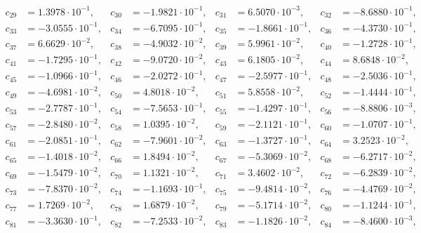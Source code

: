 \begin{align*}
c_{ 29 } &= 1.3978 \cdot 10^{ -1 }, & c_{ 30 } &= -1.9821 \cdot 10^{ -1 }, & c_{ 31 } &= 6.5070 \cdot 10^{ -3 }, & c_{ 32 } &= -8.6880 \cdot 10^{ -1 },\\ 
c_{ 33 } &= -3.0555 \cdot 10^{ -1 }, & c_{ 34 } &= -6.7095 \cdot 10^{ -1 }, & c_{ 35 } &= -1.8661 \cdot 10^{ -1 }, & c_{ 36 } &= -4.3730 \cdot 10^{ -1 },\\ 
c_{ 37 } &= 6.6629 \cdot 10^{ -2 }, & c_{ 38 } &= -4.9032 \cdot 10^{ -2 }, & c_{ 39 } &= 5.9961 \cdot 10^{ -2 }, & c_{ 40 } &= -1.2728 \cdot 10^{ -1 },\\ 
c_{ 41 } &= -1.7295 \cdot 10^{ -1 }, & c_{ 42 } &= -9.0720 \cdot 10^{ -2 }, & c_{ 43 } &= 6.1805 \cdot 10^{ -2 }, & c_{ 44 } &= 8.6848 \cdot 10^{ -2 },\\ 
c_{ 45 } &= -1.0966 \cdot 10^{ -1 }, & c_{ 46 } &= -2.0272 \cdot 10^{ -1 }, & c_{ 47 } &= -2.5977 \cdot 10^{ -1 }, & c_{ 48 } &= -2.5036 \cdot 10^{ -1 },\\ 
c_{ 49 } &= -4.6981 \cdot 10^{ -2 }, & c_{ 50 } &= 4.8018 \cdot 10^{ -2 }, & c_{ 51 } &= 5.8558 \cdot 10^{ -2 }, & c_{ 52 } &= -1.4444 \cdot 10^{ -1 },\\ 
c_{ 53 } &= -2.7787 \cdot 10^{ -1 }, & c_{ 54 } &= -7.5653 \cdot 10^{ -1 }, & c_{ 55 } &= -1.4297 \cdot 10^{ -1 }, & c_{ 56 } &= -8.8806 \cdot 10^{ -3 },\\ 
c_{ 57 } &= -2.8480 \cdot 10^{ -2 }, & c_{ 58 } &= 1.0395 \cdot 10^{ -2 }, & c_{ 59 } &= -2.1121 \cdot 10^{ -1 }, & c_{ 60 } &= -1.0707 \cdot 10^{ -1 },\\ 
c_{ 61 } &= -2.0851 \cdot 10^{ -1 }, & c_{ 62 } &= -7.9601 \cdot 10^{ -2 }, & c_{ 63 } &= -1.3727 \cdot 10^{ -1 }, & c_{ 64 } &= 3.2523 \cdot 10^{ -2 },\\ 
c_{ 65 } &= -1.4018 \cdot 10^{ -2 }, & c_{ 66 } &= 1.8494 \cdot 10^{ -2 }, & c_{ 67 } &= -5.3069 \cdot 10^{ -2 }, & c_{ 68 } &= -6.2717 \cdot 10^{ -2 },\\ 
c_{ 69 } &= -1.5479 \cdot 10^{ -2 }, & c_{ 70 } &= 1.1321 \cdot 10^{ -2 }, & c_{ 71 } &= 3.4602 \cdot 10^{ -2 }, & c_{ 72 } &= -6.2839 \cdot 10^{ -2 },\\ 
c_{ 73 } &= -7.8370 \cdot 10^{ -2 }, & c_{ 74 } &= -1.1693 \cdot 10^{ -1 }, & c_{ 75 } &= -9.4814 \cdot 10^{ -2 }, & c_{ 76 } &= -4.4769 \cdot 10^{ -2 },\\ 
c_{ 77 } &= 1.7269 \cdot 10^{ -2 }, & c_{ 78 } &= 1.6879 \cdot 10^{ -2 }, & c_{ 79 } &= -5.1714 \cdot 10^{ -2 }, & c_{ 80 } &= -1.1244 \cdot 10^{ -1 },\\ 
c_{ 81 } &= -3.3630 \cdot 10^{ -1 }, & c_{ 82 } &= -7.2533 \cdot 10^{ -2 }, & c_{ 83 } &= -1.1826 \cdot 10^{ -2 }, & c_{ 84 } &= -8.4600 \cdot 10^{ -3 },\\ 

\end{align*}
